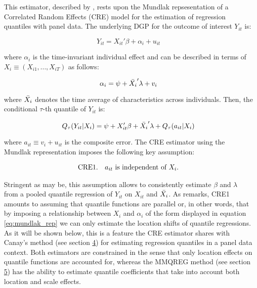 \documentclass[bib]{statapress}
\begin{document}
This estimator, described by \citep{wooldridge2010}, rests upon the
Mundlak repsesentation of a Correlated Random Effects (CRE) model for
the estimation of regression quantiles with panel data. The underlying
DGP for the outcome of interest \(Y_{it}\) is:

\[\label{eq:dgp_cre}
    Y_{it} = X_{it}' \beta + \alpha_i + u_{it}\]

where \(\alpha_i\) is the time-invariant individual effect and can be
described in terms of \(X_i \equiv (X_{i1},...,X_{iT})\) as follows:

\[\label{eq:mundlak_rep}
    \alpha_i = \psi + \Bar{X_i}' \lambda + v_i\]

where \(\Bar{X_i}\) denotes the time average of characteristics across
individuals. Then, the conditional \(\tau\)-th quantile of \(Y_{it}\)
is:

\[\label{eq:qr_cre}
    Q_{\tau}(Y_{it} | X_i) = \psi + X_{it}' \beta + \Bar{X_i}' \lambda + Q_{\tau}(a_{it} | X_i)\]

where \(a_{it} \equiv v_i + u_{it}\) is the composite error. The CRE
estimator using the Mundlak representation imposes the following key
assumption:

\[\begin{gathered}
    \text{CRE1.\quad $a_{it}$ is independent of $X_i$.}\label{eq:cre1}
\end{gathered}\]

Stringent as may be, this assumption allows to consistently estimate
\(\beta\) and \(\lambda\) from a pooled quantile regression of
\(Y_{it}\) on \(X_{it}\) and \(\Bar{X_{i}}\). As \citep{wooldridge2010}
remarks, CRE1 amounts to assuming that quantile functions are parallel
or, in other words, that by imposing a relationship between \(X_{i}\)
and \(\alpha_i\) of the form displayed in equation
\hyperref[eq:mundlak_rep]{{[}eq:mundlak\_rep{]}} we can only estimate
the location shifts of quantile regressions. As it will be shown below,
this is a feature the CRE estimator shares with Canay's method (see
section \hyperref[sec:canay]{4}) for estimating regression quantiles in
a panel data context. Both estimators are constrained in the sense that
only location effects on quantile functions are accounted for, whereas
the MMQREG method (see section \hyperref[sec:mmqreg]{5}) has the ability
to estimate quantile coefficients that take into account both location
and scale effects.
\end{document}
